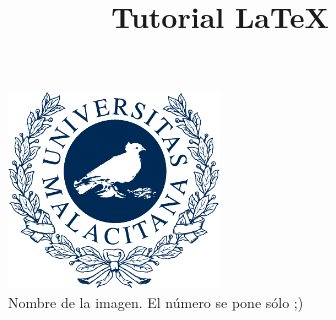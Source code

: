 \documentclass{article}
\title{Tutorial \LaTeX}
\begin{document}
%


\clearpage




\tableofcontents
\listoffigures

\newpage





\renewcommand{\headrulewidth}{0.5pt}

\cfoot[c1]{}
\rfoot[e1]{\thepage}
\renewcommand{\footrulewidth}{0.5pt}

\pagestyle{fancy} 

%
%

\begin{figure}[hbtp]
    \centering
	\includegraphics[width = 0.5\textwidth]{Images/logo_uma.pdf}
    \caption{Nombre de la imagen. El número se pone sólo ;)}
    \label{fig:prueba de otra imagen}
\end{figure}
\end{document}
